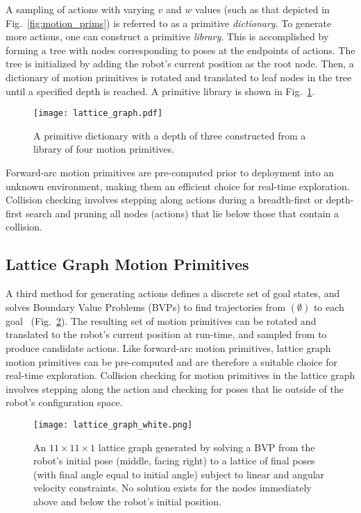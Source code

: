 A sampling of actions with varying $v$ and $w$ values (such as that depicted in
Fig.~\ref{fig:motion_prims}) is referred to as a
primitive \textit{dictionary}. To generate more actions, one can construct a
primitive \textit{library}. This is accomplished by forming a tree with nodes
corresponding to poses at the endpoints of actions. The tree is initialized by adding
the robot's current position as the root node. Then, a dictionary of motion
primitives is rotated and translated to leaf nodes in the tree until a specified
depth is reached. A primitive library is shown in
Fig.~\ref{fig:primitive_library}.
%
\begin{figure}
  \centering
  \texttt{[image: lattice\_graph.pdf]}
  \caption{A primitive dictionary with a depth of three constructed from a
  library of four motion primitives. \label{fig:primitive_library}}
\end{figure}

Forward-arc motion primitives are pre-computed prior to deployment into an
unknown environment, making them an efficient choice for real-time exploration. Collision
checking involves stepping along actions during a breadth-first or depth-first search and
pruning all nodes (actions) that lie below those that contain a collision.

\subsection{Lattice Graph Motion Primitives}
\label{subsec:lg_motion_primitives}

A third method for generating actions defines a discrete set of goal states, and
solves Boundary Value Problems (BVPs) to find trajectories from $(\emptyset)$ to
each goal~\cite{pivtoraiko2005generating,pivtoraiko2009differentially,pivtoraiko2013incremental}
(Fig.~\ref{fig:lattice_graph}). The resulting set of motion primitives can
be rotated and translated to the robot's current position at run-time, and sampled
from to produce candidate actions. Like forward-arc motion primitives, lattice
graph motion primitives can be pre-computed and are therefore a suitable choice for
real-time exploration. Collision checking for motion primitives in the lattice
graph involves stepping along the action and checking for poses that lie outside
of the robot's configuration space.

\begin{figure}[b]
  \centering
  \texttt{[image: lattice\_graph\_white.png]}
  \caption{An $11\times 11 \times 1$ lattice graph generated by solving a BVP
  from the robot's initial pose (middle, facing right) to a lattice of final
poses (with final angle equal to initial angle) subject to linear and angular velocity
constraints. No solution exists for the nodes immediately above and below the
robot's initial position. \label{fig:lattice_graph}}
\end{figure}

